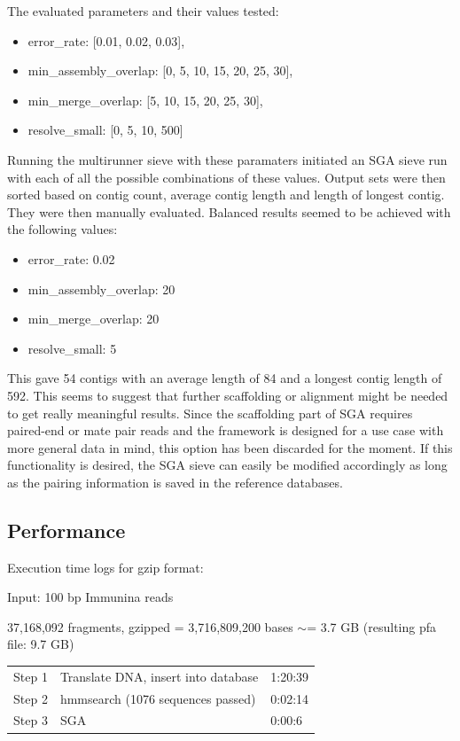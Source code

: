 \documentclass[a4paper,12pt]{article}
\begin{document}
The evaluated parameters and their values tested:
\begin{itemize}
\item
error\_rate: [0.01, 0.02, 0.03],
\item
min\_assembly\_overlap: [0, 5, 10, 15, 20, 25, 30],
\item
min\_merge\_overlap: [5, 10, 15, 20, 25, 30],
\item
resolve\_small: [0, 5, 10, 500]
\end{itemize}

Running the multirunner sieve with these paramaters initiated an SGA sieve run with each of all the possible combinations of these values. Output sets were then sorted based on contig count, average contig length and length of longest contig. They were then manually evaluated. Balanced results seemed to be achieved with the following values:
\begin{itemize}
\item
error\_rate: 0.02
\item
min\_assembly\_overlap: 20
\item
min\_merge\_overlap: 20
\item
resolve\_small: 5
\end{itemize}
This gave 54 contigs with an average length of 84 and a longest contig length of 592. This seems to suggest that further scaffolding or alignment might be needed to get really meaningful results. Since the scaffolding part of SGA requires paired-end or mate pair reads and the framework is designed for a use case with more general data in mind, this option has been discarded for the moment. If this functionality is desired, the SGA sieve can easily be modified accordingly as long as the pairing information is saved in the reference databases.

\subsection{Performance}
Execution time logs for gzip format:

Input: 100 bp Immunina reads

37,168,092 fragments, gzipped = 3,716,809,200 bases $\sim$= 3.7 GB (resulting pfa file: 9.7 GB)

\begin{tabular}{lll}
Step 1&Translate DNA, insert into database&1:20:39\\
Step 2&hmmsearch (1076 sequences passed)&0:02:14\\
Step 3&SGA&0:00:6
\end{tabular}
\end{document}
